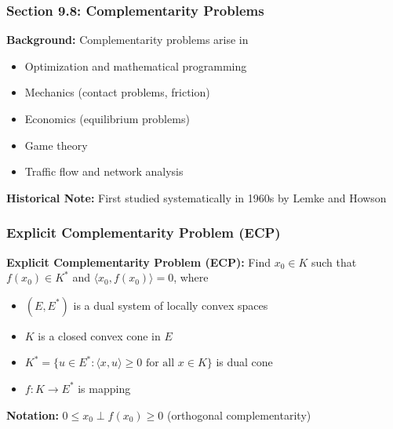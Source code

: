 \documentclass[aspectratio=169,10pt]{beamer}
\begin{document}
\begin{frame}
    \frametitle{Section 9.8: Complementarity Problems}

    \textbf{Background:} Complementarity problems arise in
    \begin{itemize}
        \item Optimization and mathematical programming
        \item Mechanics (contact problems, friction)
        \item Economics (equilibrium problems)
        \item Game theory
        \item Traffic flow and network analysis
    \end{itemize}

    \bigskip

    \textbf{Historical Note:} First studied systematically in 1960s by Lemke and Howson
\end{frame}

\begin{frame}
    \frametitle{Explicit Complementarity Problem (ECP)}

    \begin{definition}
        \textbf{Explicit Complementarity Problem (ECP):} Find $x_0 \in K$ such that $f(x_0) \in K^*$ and $\langle x_0, f(x_0) \rangle = 0$, where
        \begin{itemize}
            \item $(E, E^*)$ is a dual system of locally convex spaces
            \item $K$ is a closed convex cone in $E$
            \item $K^* = \{u \in E^* : \langle x, u \rangle \geq 0 \text{ for all } x \in K\}$ is dual cone
            \item $f: K \to E^*$ is mapping
        \end{itemize}
    \end{definition}

    \bigskip

    \textbf{Notation:} $0 \leq x_0 \perp f(x_0) \geq 0$ (orthogonal complementarity)
\end{frame}
\end{document}
